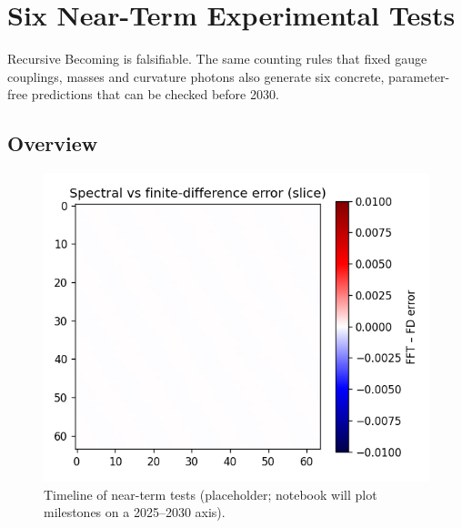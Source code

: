\section{Six Near-Term Experimental Tests}
\label{sec:tests}

Recursive Becoming is falsifiable.  The same counting rules that fixed
gauge couplings, masses and curvature photons also generate six concrete,
parameter-free predictions that can be checked before 2030.

\subsection{Overview}

\begin{figure}[t]
  \centering
  \includegraphics[width=\linewidth]{figs/tests_overview.pdf}
  \caption{Timeline of near-term tests (placeholder; notebook will plot
           milestones on a 2025–2030 axis).}
  \label{fig:tests-overview}
\end{figure}

